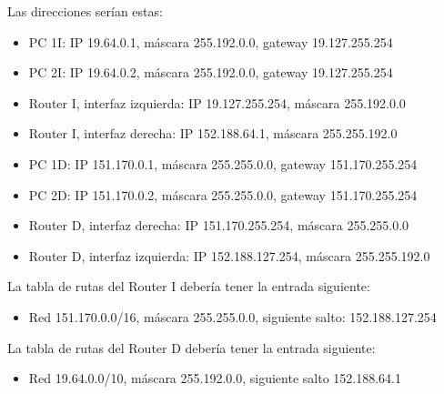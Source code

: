 \documentclass[letterpaper,10pt,spanish]{sphinxmanual}
\begin{document}
\sphinxAtStartPar
Las direcciones serían estas:
\begin{itemize}
\item {} 
\sphinxAtStartPar
PC 1I: IP 19.64.0.1, máscara 255.192.0.0, gateway 19.127.255.254

\item {} 
\sphinxAtStartPar
PC 2I: IP 19.64.0.2, máscara 255.192.0.0, gateway 19.127.255.254

\item {} 
\sphinxAtStartPar
Router I, interfaz izquierda: IP 19.127.255.254, máscara 255.192.0.0

\item {} 
\sphinxAtStartPar
Router I, interfaz derecha: IP 152.188.64.1, máscara 255.255.192.0

\item {} 
\sphinxAtStartPar
PC 1D: IP 151.170.0.1, máscara 255.255.0.0, gateway 151.170.255.254

\item {} 
\sphinxAtStartPar
PC 2D: IP 151.170.0.2, máscara 255.255.0.0, gateway 151.170.255.254

\item {} 
\sphinxAtStartPar
Router D, interfaz derecha: IP 151.170.255.254, máscara 255.255.0.0

\item {} 
\sphinxAtStartPar
Router D, interfaz izquierda: IP 152.188.127.254, máscara 255.255.192.0

\end{itemize}

\sphinxAtStartPar
La tabla de rutas del Router I debería tener la entrada siguiente:
\begin{itemize}
\item {} 
\sphinxAtStartPar
Red 151.170.0.0/16, máscara 255.255.0.0, siguiente salto: 152.188.127.254

\end{itemize}

\sphinxAtStartPar
La tabla de rutas del Router D debería tener la entrada siguiente:
\begin{itemize}
\item {} 
\sphinxAtStartPar
Red 19.64.0.0/10, máscara 255.192.0.0, siguiente salto 152.188.64.1

\end{itemize}
\end{document}
